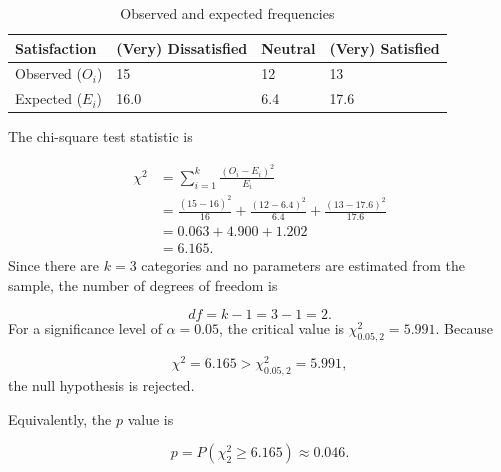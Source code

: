 \begin{table}[htbp]
\centering
\begin{tabularx}{\textwidth}{@{}lYYY@{}}
\toprule
Satisfaction &
(Very) Dissatisfied &
Neutral &
(Very) Satisfied \\
\midrule
Observed ($O_i$) & 15 & 12 & 13 \\
Expected ($E_i$) & 16.0 & 6.4 & 17.6 \\
\bottomrule
\end{tabularx}
\caption{Observed and expected frequencies}
\label{tab:gof_expected}
\end{table}
\noindent The chi-square test statistic is

\begin{align}
\chi^2 &= \sum_{i=1}^{k} \frac{(O_i-E_i)^2}{E_i} \label{eq:chi_square_test_statistic} \\
       &= \frac{(15-16)^2}{16} + \frac{(12-6.4)^2}{6.4} + \frac{(13-17.6)^2}{17.6} \nonumber \\
       &= 0.063 + 4.900 + 1.202 \nonumber \\
       &= 6.165. \nonumber
\end{align}
Since there are $k=3$ categories and no parameters are estimated from the sample, the number of degrees of freedom is

\begin{equation*}
df = k-1 = 3-1 = 2.
\end{equation*}
For a significance level of $\alpha=0.05$, the critical value is $\chi^2_{0.05,2} = 5.991$. Because

\begin{equation*}
\chi^2 = 6.165 > \chi^2_{0.05,2} = 5.991,
\end{equation*}
the null hypothesis is rejected.

\medskip
\noindent Equivalently, the $p$ value is

\begin{equation*}
    p = P(\chi^2_2 \geq 6.165) \approx 0.046.
\end{equation*}

